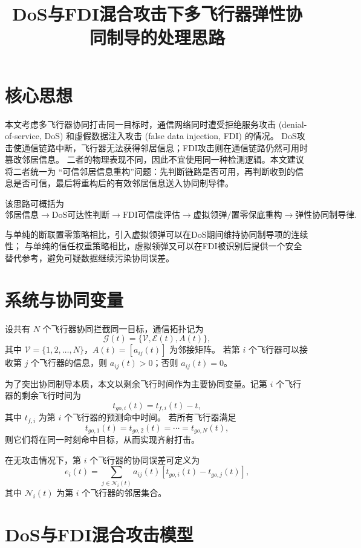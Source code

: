 \documentclass[UTF8,a4paper,11pt]{ctexart}
\title{DoS与FDI混合攻击下多飞行器弹性协同制导的处理思路}
\author{}
\date{}
\begin{document}
\maketitle

\section{核心思想}

本文考虑多飞行器协同打击同一目标时，通信网络同时遭受拒绝服务攻击
(denial-of-service, DoS) 和虚假数据注入攻击 (false data injection, FDI) 的情况。
DoS攻击使通信链路中断，飞行器无法获得邻居信息；FDI攻击则在通信链路仍然可用时篡改邻居信息。
二者的物理表现不同，因此不宜使用同一种检测逻辑。本文建议将二者统一为
``可信邻居信息重构''问题：先判断链路是否可用，再判断收到的信息是否可信，最后将重构后的有效邻居信息送入协同制导律。

该思路可概括为
\[
\text{邻居信息}
\rightarrow
\text{DoS可达性判断}
\rightarrow
\text{FDI可信度评估}
\rightarrow
\text{虚拟领弹/置零保底重构}
\rightarrow
\text{弹性协同制导律}.
\]

与单纯的断联置零策略相比，引入虚拟领弹可以在DoS期间维持协同制导项的连续性；
与单纯的信任权重策略相比，虚拟领弹又可以在FDI被识别后提供一个安全替代参考，避免可疑数据继续污染协同误差。

\section{系统与协同变量}

设共有 $N$ 个飞行器协同拦截同一目标，通信拓扑记为
\[
\mathcal{G}(t)=\{\mathcal{V},\mathcal{E}(t),A(t)\},
\]
其中 $\mathcal{V}=\{1,2,\ldots,N\}$，$A(t)=[a_{ij}(t)]$ 为邻接矩阵。
若第 $i$ 个飞行器可以接收第 $j$ 个飞行器的信息，则 $a_{ij}(t)>0$；否则 $a_{ij}(t)=0$。

为了突出协同制导本质，本文以剩余飞行时间作为主要协同变量。记第 $i$ 个飞行器的剩余飞行时间为
\[
t_{go,i}(t)=t_{f,i}(t)-t,
\]
其中 $t_{f,i}$ 为第 $i$ 个飞行器的预测命中时间。
若所有飞行器满足
\[
t_{go,1}(t)=t_{go,2}(t)=\cdots=t_{go,N}(t),
\]
则它们将在同一时刻命中目标，从而实现齐射打击。

在无攻击情况下，第 $i$ 个飞行器的协同误差可定义为
\begin{equation}
e_i(t)=
\sum_{j\in\mathcal{N}_i(t)}
a_{ij}(t)\left[t_{go,i}(t)-t_{go,j}(t)\right],
\label{eq:nominal_error}
\end{equation}
其中 $\mathcal{N}_i(t)$ 为第 $i$ 个飞行器的邻居集合。

\section{DoS与FDI混合攻击模型}
\end{document}
